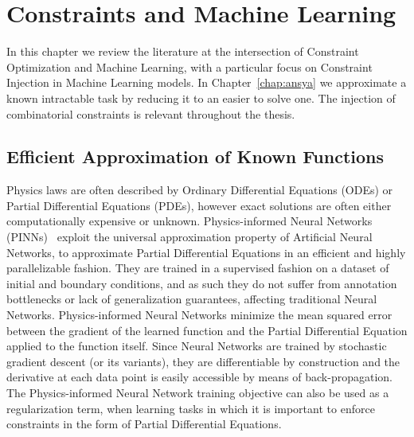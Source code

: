 \chapter{Constraints and Machine Learning}
\label{chap:ciml}

In this chapter we review the literature at the intersection of Constraint Optimization and Machine Learning, with a particular focus on Constraint Injection in Machine Learning models.
In Chapter~\ref{chap:ansya} we approximate a known intractable task by reducing it to an easier to solve one. The injection of combinatorial constraints is relevant throughout the thesis.
\section{Efficient Approximation of Known Functions} Physics laws are often described by Ordinary Differential Equations (ODEs) or Partial Differential Equations (PDEs), however exact solutions are often either computationally expensive or unknown.
%
Physics-informed Neural Networks (PINNs)~\cite{raissi2019physics} exploit the universal approximation property of Artificial Neural Networks, to approximate Partial Differential Equations in an efficient and highly parallelizable fashion. They are trained in a supervised fashion on a dataset of initial and boundary conditions, and as such they do not suffer from annotation bottlenecks or lack of generalization guarantees, affecting traditional Neural Networks.
Physics-informed Neural Networks minimize the mean squared error between the gradient of the learned function and the Partial Differential Equation applied to the function itself.
Since Neural Networks are trained by stochastic gradient descent (or its variants), they are differentiable by construction and the derivative at each data point is easily accessible by means of back-propagation.
The Physics-informed Neural Network training objective can also be used as a regularization term, when learning tasks in which it is important to enforce constraints in the form of Partial Differential Equations.

